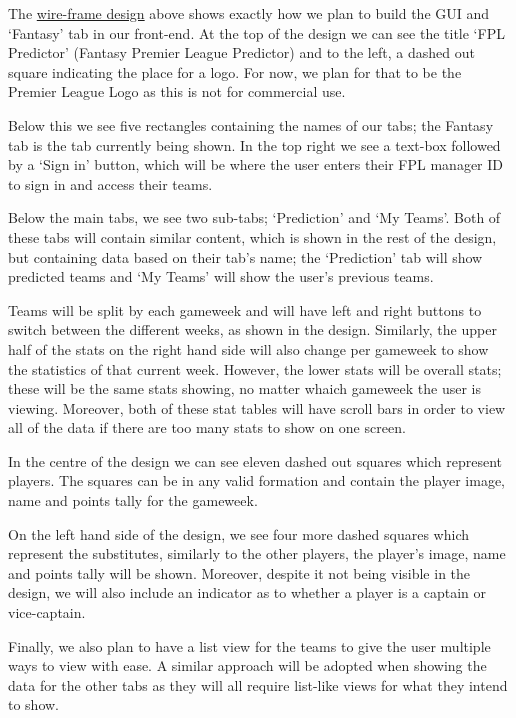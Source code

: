 \documentclass[12pt, a4paper, oneside]{book}
\numberwithin{equation}{section}
\begin{document}
The \hyperref[Main page wire-frame]{wire-frame design} above shows exactly how we plan to build the GUI and `Fantasy' tab in our front-end. At the top of the design we can see the title `FPL Predictor' (Fantasy Premier League Predictor) and to the left, a dashed out square indicating the place for a logo. For now, we plan for that to be the Premier League Logo as this is not for commercial use.

Below this we see five rectangles containing the names of our tabs; the Fantasy tab is the tab currently being shown. In the top right we see a text-box followed by a `Sign in' button, which will be where the user enters their FPL manager ID to sign in and access their teams.

Below the main tabs, we see two sub-tabs; `Prediction' and `My Teams'. Both of these tabs will contain similar content, which is shown in the rest of the design, but containing data based on their tab's name; the `Prediction' tab will show predicted teams and `My Teams' will show the user's previous teams.

Teams will be split by each gameweek and will have left and right buttons to switch between the different weeks, as shown in the design. Similarly, the upper half of the stats on the right hand side will also change per gameweek to show the statistics of that current week. However, the lower stats will be overall stats; these will be the same stats showing, no matter whaich gameweek the user is viewing. Moreover, both of these stat tables will have scroll bars in order to view all of the data if there are too many stats to show on one screen.

In the centre of the design we can see eleven dashed out squares which represent players. The squares can be in any valid formation and contain the player image, name and points tally for the gameweek.

On the left hand side of the design, we see four more dashed squares which represent the substitutes, similarly to the other players, the player's image, name and points tally will be shown. Moreover, despite it not being visible in the design, we will also include an indicator as to whether a player is a captain or vice-captain.

Finally, we also plan to have a list view for the teams to give the user multiple ways to view with ease. A similar approach will be adopted when showing the data for the other tabs as they will all require list-like views for what they intend to show.
\end{document}

